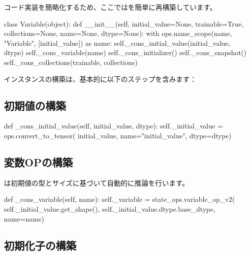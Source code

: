 \begin{content}

コード実装を簡略化するため、ここではを簡単に再構築しています。

\begin{leftbar}
\begin{python}
class Variable(object):
  def __init__(self, initial_value=None, trainable=True,
    collections=None, name=None, dtype=None):
    with ops.name_scope(name, "Variable", [initial_value]) as name:
      self._cons_initial_value(initial_value, dtype)
      self._cons_variable(name)
      self._cons_initializer()
      self._cons_snapshot()
    self._cons_collections(trainable, collections)
\end{python}
\end{leftbar}

インスタンスの構築は、基本的に以下のステップを含みます：

\subsection{初期値の構築}

\begin{leftbar}
\begin{python}
  def _cons_initial_value(self, initial_value, dtype):
    self._initial_value = ops.convert_to_tensor(
        initial_value, name="initial_value", dtype=dtype)
\end{python}
\end{leftbar}

\subsection{変数OPの構築}

は初期値の型とサイズに基づいて自動的に推論を行います。

\begin{leftbar}
\begin{python}
  def _cons_variable(self, name):
    self._variable = state_ops.variable_op_v2(
      self._initial_value.get_shape(),
      self._initial_value.dtype.base_dtype,
      name=name)
\end{python}
\end{leftbar}

\subsection{初期化子の構築}


\end{content}
